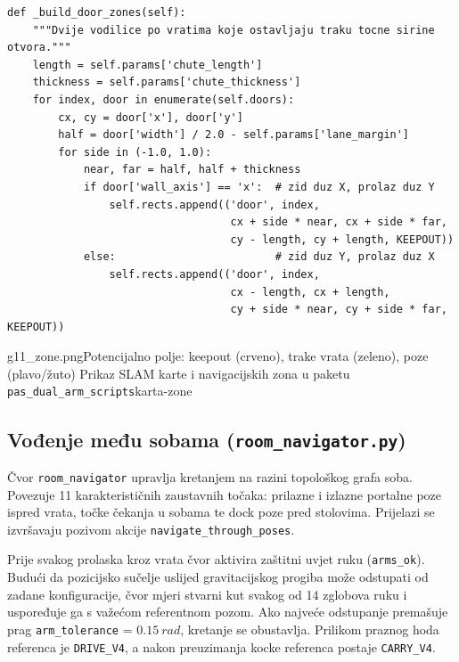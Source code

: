 \begin{lstlisting}[style=code-python, caption={Generiranje usmjeravajućih traka za okomit prolaz kroz vrata (\texttt{nav\_zones.py}, redci 95--117)}, label={lst:nav-zones}]
def _build_door_zones(self):
    """Dvije vodilice po vratima koje ostavljaju traku tocne sirine otvora."""
    length = self.params['chute_length']
    thickness = self.params['chute_thickness']
    for index, door in enumerate(self.doors):
        cx, cy = door['x'], door['y']
        half = door['width'] / 2.0 - self.params['lane_margin']
        for side in (-1.0, 1.0):
            near, far = half, half + thickness
            if door['wall_axis'] == 'x':  # zid duz X, prolaz duz Y
                self.rects.append(('door', index,
                                   cx + side * near, cx + side * far,
                                   cy - length, cy + length, KEEPOUT))
            else:                         # zid duz Y, prolaz duz X
                self.rects.append(('door', index,
                                   cx - length, cx + length,
                                   cy + side * near, cy + side * far, KEEPOUT))
\end{lstlisting}

%
  {g11_zone.png}{Potencijalno polje: keepout (crveno), trake vrata (zeleno), poze (plavo/žuto)}%
  {Prikaz SLAM karte i navigacijskih zona u paketu \texttt{pas\_dual\_arm\_scripts}}{karta-zone}

\subsection{Vođenje među sobama (\texttt{room\_navigator.py})}
\label{sec:06-room-navigator}

Čvor \texttt{room\_navigator} upravlja kretanjem na razini topološkog grafa soba. Povezuje 11
karakterističnih zaustavnih točaka: prilazne i izlazne portalne poze ispred vrata, točke čekanja u
sobama te dock poze pred stolovima. Prijelazi se izvršavaju pozivom akcije
\texttt{navigate\_through\_poses}.

Prije svakog prolaska kroz vrata čvor aktivira zaštitni uvjet ruku (\texttt{arms\_ok}). Budući da
pozicijsko sučelje uslijed gravitacijskog progiba može odstupati od zadane konfiguracije, čvor mjeri
stvarni kut svakog od 14 zglobova ruku i uspoređuje ga s važećom referentnom pozom. Ako najveće
odstupanje premašuje prag \texttt{arm\_tolerance} = $\SI{0.15}{rad}$, kretanje se obustavlja.
Prilikom praznog hoda referenca je \texttt{DRIVE\_V4}, a nakon preuzimanja kocke referenca postaje
\texttt{CARRY\_V4}.

